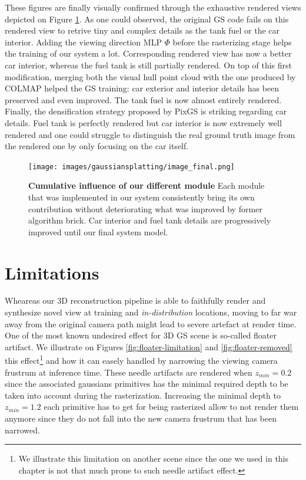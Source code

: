 These figures are finally visually confirmed through the exhaustive rendered views depicted on Figure \ref{fig:gs-vh-result}. As one could observed, the original GS code fails on this rendered view to retrive tiny and complex details as the tank fuel or the car interior. Adding the viewing direction MLP $\Phi$ before the rasterizing stage helps the training of our system a lot. Corresponding rendered view has now a better car interior, whereas the fuel tank is still partially rendered. On top of this first modification, merging both the visual hull point cloud with the one produced by COLMAP helped the GS training: car exterior and interior details has been preserved and even improved. The tank fuel is now almost entirely rendered. Finally, the densification strategy proposed by PixGS is striking regarding car details. Fuel tank is perfectly rendered but car interior is now extremely well rendered and one could struggle to distinguish the real ground truth image from the rendered one by only focusing on the car itself.   

\begin{figure}[htb!]
  \center
\texttt{[image: images/gaussiansplatting/image\_final.png]}
\caption{\textbf{Cumulative influence of our different module} Each module that was implemented in our system consistently bring its own contribution without deteriorating what was improved by former algorithm brick. Car interior and fuel tank details are progressively improved until our final system model.}
\label{fig:gs-vh-result}
\end{figure}

\section{Limitations}
\label{sec:gs-limitation}

Wheareas our 3D reconstruction pipeline is able to faithfully render and synthesize novel view at training and \textit{in-distribution} locations, moving to far war away from the original camera path might lead to severe artefact at render time. One of the most known undesired effect for 3D \ac{GS} scene is so-called floater artifact. We illustrate on Figures \ref{fig:floater-limitation} and \ref{fig:floater-removed} this effect\footnote{We illustrate this limitation on another scene since the one we used in this chapter is not that much prone to such needle artifact effect.} and how it can easely handled by narrowing the viewing camera frustrum at inference time. These needle artifacts are rendered when $z_{min}=0.2$ since the associated gaussians primitives has the minimal required depth to be taken into account during the rasterization. Increasing the minimal depth to $z_{min}=1.2$ each primitive has to get for being rasterized allow to not render them anymore since they do not fall into the new camera frustrum that has been narrowed. 

